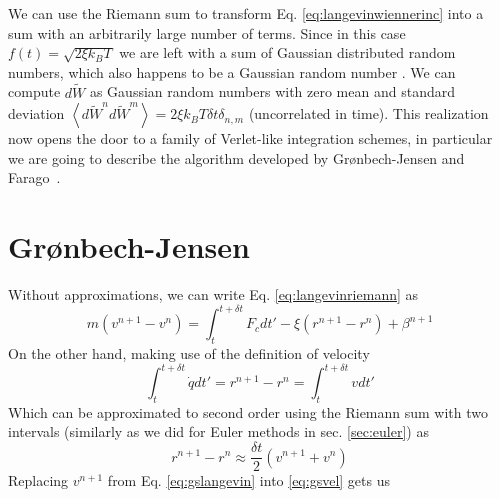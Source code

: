 \documentclass[ twoside,openright,titlepage,numbers=noenddot,%
headinclude,footinclude,cleardoublepage=empty,abstract=on,
BCOR=5mm,paper=b5,fontsize=11pt, dvipsnames
]{scrreprt}
\newcommand{\dt}{\delta t}
\newcommand{\kT}{k_B T}
\newcommand{\noise}{\widetilde{W}}
\newcommand{\ppos}{q}
\begin{document}
We can use the Riemann sum to transform Eq. \eqref{eq:langevinwiennerinc} into a sum with an arbitrarily large number of terms. Since in this case $f(t) = \sqrt{2\xi\kT}$ we are left with a sum of Gaussian distributed random numbers, which also happens to be a Gaussian random number . We can compute $d\noise$ as Gaussian random numbers with zero mean and standard deviation $\left\langle d\noise^nd\noise^m\right\rangle = 2\xi\kT\dt\delta_{n,m}$ (uncorrelated in time).
This realization now opens the door to a family of Verlet-like integration schemes, in particular we are going to describe the algorithm developed by Grønbech-Jensen and Farago~\cite{Gronbech2013}.

\section{Grønbech-Jensen}\label{sec:gronbechjensen}
Without approximations, we can write Eq. \eqref{eq:langevinriemann} as
\begin{equation}
  \label{eq:gslangevin}
  m\left(v^{n+1}-v^n\right) = \int_t^{t+\dt}F_c dt' - \xi\left(r^{n+1}-r^n\right) + \beta^{n+1}
\end{equation}
On the other hand, making use of the definition of velocity
\begin{equation}
  \int_t^{t+\dt}\dot{\ppos}dt' = r^{n+1} - r^n = \int_t^{t+\dt}vdt'
\end{equation}
Which can be approximated to second order using the Riemann sum with two intervals (similarly as we did for Euler methods in sec. \ref{sec:euler}) as
\begin{equation}
  \label{eq:gsvel}
  r^{n+1} - r^n \approx \frac{\dt}{2}\left(v^{n+1}+v^n\right)
\end{equation}
Replacing $v^{n+1}$ from Eq. \eqref{eq:gslangevin} into \eqref{eq:gsvel} gets us
\end{document}
